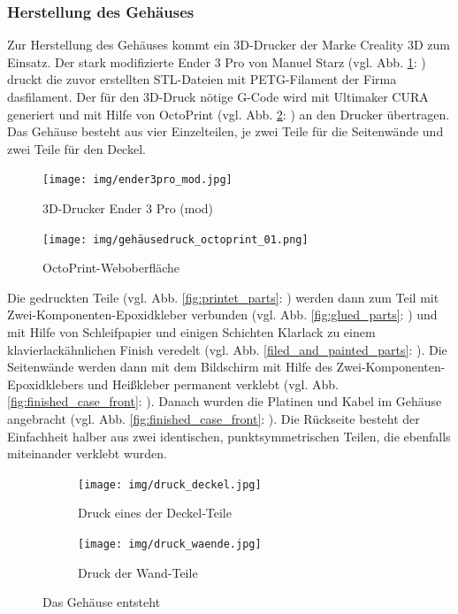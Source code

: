 \subsubsection{Herstellung des Gehäuses}\label{hw_case_herstellung}
Zur Herstellung des Gehäuses kommt ein 3D-Drucker der Marke Creality 3D zum Einsatz. 
Der stark modifizierte Ender 3 Pro von Manuel Starz (vgl. Abb. \ref{fig:ender3}: ) druckt die zuvor erstellten STL-Dateien mit PETG-Filament der Firma dasfilament. 
Der für den 3D-Druck nötige G-Code wird mit Ultimaker CURA generiert und mit Hilfe von OctoPrint (vgl. Abb. \ref{fig:octoprint}: ) an den Drucker übertragen. Das Gehäuse besteht aus vier Einzelteilen, je zwei Teile für die Seitenwände und zwei Teile für den Deckel.\par
\begin{figure}[H]
	\begin{center}
	\texttt{[image: img/ender3pro\_mod.jpg]}
	\end{center}
	\caption[3D-Drucker Ender 3 Pro (mod)]{3D-Drucker Ender 3 Pro (mod)}
	\label{fig:ender3}
\end{figure}
\begin{figure}[H]
	\texttt{[image: img/gehäusedruck\_octoprint\_01.png]}
	\caption[OctoPrint-Weboberfläche]{OctoPrint-Weboberfläche}
	\label{fig:octoprint}
\end{figure}
\noindent Die gedruckten Teile (vgl. Abb. \ref{fig:printet_parts}: ) werden dann zum Teil mit Zwei-Komponenten-Epoxidkleber verbunden (vgl. Abb. \ref{fig:glued_parts}: ) und mit Hilfe von Schleifpapier und einigen Schichten Klarlack zu einem klavierlackähnlichen Finish veredelt (vgl. Abb. \ref{filed_and_painted_parts}: ). 
Die Seitenwände werden dann mit dem Bildschirm mit Hilfe des Zwei-Komponenten-Epoxidklebers und Heißkleber permanent verklebt (vgl. Abb. \ref{fig:finished_case_front}: ).
Danach wurden die Platinen und Kabel im Gehäuse angebracht (vgl. Abb. \ref{fig:finished_case_front}: ). 
Die Rückseite besteht der Einfachheit halber aus zwei identischen, punktsymmetrischen Teilen, die ebenfalls miteinander verklebt wurden.\par
\begin{figure}[H]
	\begin{subfigure}[b]{0.5\linewidth}
		\centering
		\texttt{[image: img/druck\_deckel.jpg]}
		\caption[Druck eines der Deckel-Teile]{Druck eines der Deckel-Teile}
	\end{subfigure}
	\begin{subfigure}[b]{0.5\linewidth}
		\texttt{[image: img/druck\_waende.jpg]}
		\caption[Druck der Wand-Teile]{Druck der Wand-Teile}
	\end{subfigure}
	\caption[Das Gehäuse entsteht]{Das Gehäuse entsteht}
	\label{fig:printing_parts}
\end{figure}
